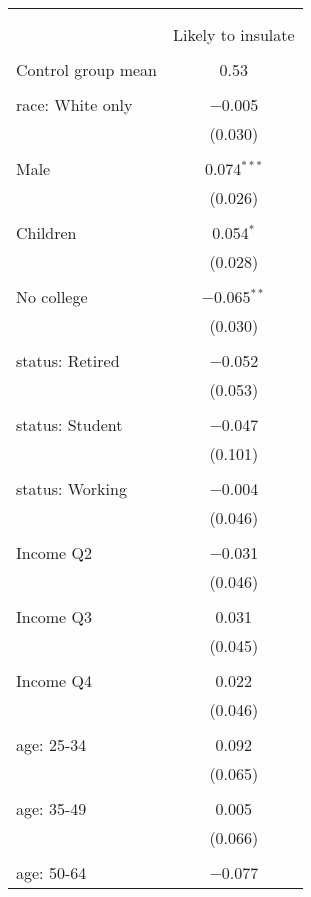 
\begin{tabular}{@{\extracolsep{5pt}}lc} 
\\[-1.8ex]\hline 
\hline \\[-1.8ex] 
\\[-1.8ex] & Likely to insulate \\ 
\hline \\[-1.8ex] 
 Control group mean & 0.53  \\ \hline \\[-1.8ex] race: White only & $-$0.005 \\ 
  & (0.030) \\ 
  & \\ 
 Male & 0.074$^{***}$ \\ 
  & (0.026) \\ 
  & \\ 
 Children & 0.054$^{*}$ \\ 
  & (0.028) \\ 
  & \\ 
 No college & $-$0.065$^{**}$ \\ 
  & (0.030) \\ 
  & \\ 
 status: Retired & $-$0.052 \\ 
  & (0.053) \\ 
  & \\ 
 status: Student & $-$0.047 \\ 
  & (0.101) \\ 
  & \\ 
 status: Working & $-$0.004 \\ 
  & (0.046) \\ 
  & \\ 
 Income Q2 & $-$0.031 \\ 
  & (0.046) \\ 
  & \\ 
 Income Q3 & 0.031 \\ 
  & (0.045) \\ 
  & \\ 
 Income Q4 & 0.022 \\ 
  & (0.046) \\ 
  & \\ 
 age: 25-34 & 0.092 \\ 
  & (0.065) \\ 
  & \\ 
 age: 35-49 & 0.005 \\ 
  & (0.066) \\ 
  & \\ 
 age: 50-64 & $-$0.077 \\ 

\end{tabular}
